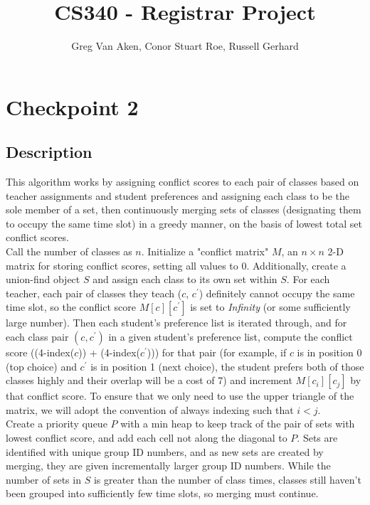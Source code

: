 \documentclass[11pt, oneside]{article}   	%
\title{CS340 - Registrar Project}
\author{Greg Van Aken, Conor Stuart Roe, Russell Gerhard}
\begin{document}
\maketitle

\section{Checkpoint 2}
\subsection{Description}
This algorithm works by assigning conflict scores to each pair of classes based on teacher assignments and student preferences and assigning each class to be the sole member of a set, then continuously merging sets of classes (designating them to occupy the same time slot) in a greedy manner, on the basis of lowest total set conflict scores. \\

Call the number of classes as $n$. Initialize a "conflict matrix" $M$, an $n \times n$ 2-D matrix for storing conflict scores, setting all values to 0. Additionally, create a union-find object $S$ and assign each class to its own set within $S$. For each teacher, each pair of classes they teach ($c$, $c^\prime$) definitely cannot occupy the same time slot, so the conflict score $M[c][c^\prime]$ is set to {\it Infinity} (or some sufficiently large number). Then each student's preference list is iterated through, and for each class pair $(c, c^\prime)$ in a given student's preference list, compute the conflict score ((4-index($c$)) + (4-index($c^\prime$))) for that pair (for example, if $c$ is in position 0 (top choice) and $c^\prime$ is in position 1 (next choice), the student prefers both of those classes highly and their overlap will be a cost of 7) and increment $M[c_i][c_j]$  by that conflict score. To ensure that we only need to use the upper triangle of the matrix, we will adopt the convention of always indexing such that $i < j$. \\

Create a priority queue $P$ with a min heap to keep track of the pair of sets with lowest conflict score, and add each cell not along the diagonal to $P$. Sets are identified with unique group ID numbers, and as new sets are created by merging, they are given incrementally larger group ID numbers. While the number of sets in $S$ is greater than the number of class times, classes still haven't been grouped into sufficiently few time slots, so merging must continue. \\
\end{document}

